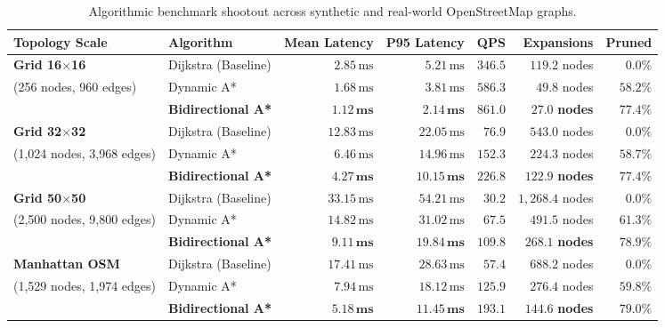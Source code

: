 \documentclass[10pt,a4paper]{article}
\begin{document}
\begin{table}[H]
\centering
\sffamily\scriptsize
\renewcommand{\arraystretch}{1.10}
\begin{tabularx}{\textwidth}{l l r r r r r}
\toprule
\textbf{Topology Scale} & \textbf{Algorithm} & \textbf{Mean Latency} & \textbf{P95 Latency} & \textbf{QPS} & \textbf{Expansions} & \textbf{Pruned} \\
\midrule
\textbf{Grid 16$\times$16} & Dijkstra (Baseline)  & $2.85\,\text{ms}$ & $5.21\,\text{ms}$ & $346.5$ & $119.2$ nodes & $0.0\%$ \\
(256 nodes, 960 edges)     & Dynamic A*           & $1.68\,\text{ms}$ & $3.81\,\text{ms}$ & $586.3$ & $49.8$ nodes  & $58.2\%$ \\
                           & \textbf{Bidirectional A*} & $\mathbf{1.12\,\text{ms}}$ & $\mathbf{2.14\,\text{ms}}$ & $\mathbf{861.0}$ & $\mathbf{27.0}$ \textbf{nodes} & $\mathbf{77.4\%}$ \\
\midrule
\textbf{Grid 32$\times$32} & Dijkstra (Baseline)  & $12.83\,\text{ms}$ & $22.05\,\text{ms}$ & $76.9$ & $543.0$ nodes & $0.0\%$ \\
(1,024 nodes, 3,968 edges) & Dynamic A*           & $6.46\,\text{ms}$ & $14.96\,\text{ms}$ & $152.3$ & $224.3$ nodes & $58.7\%$ \\
                           & \textbf{Bidirectional A*} & $\mathbf{4.27\,\text{ms}}$ & $\mathbf{10.15\,\text{ms}}$ & $\mathbf{226.8}$ & $\mathbf{122.9}$ \textbf{nodes} & $\mathbf{77.4\%}$ \\
\midrule
\textbf{Grid 50$\times$50} & Dijkstra (Baseline)  & $33.15\,\text{ms}$ & $54.21\,\text{ms}$ & $30.2$ & $1,268.4$ nodes & $0.0\%$ \\
(2,500 nodes, 9,800 edges) & Dynamic A*           & $14.82\,\text{ms}$ & $31.02\,\text{ms}$ & $67.5$ & $491.5$ nodes & $61.3\%$ \\
                           & \textbf{Bidirectional A*} & $\mathbf{9.11\,\text{ms}}$ & $\mathbf{19.84\,\text{ms}}$ & $\mathbf{109.8}$ & $\mathbf{268.1}$ \textbf{nodes} & $\mathbf{78.9\%}$ \\
\midrule
\textbf{Manhattan OSM}     & Dijkstra (Baseline)  & $17.41\,\text{ms}$ & $28.63\,\text{ms}$ & $57.4$ & $688.2$ nodes & $0.0\%$ \\
(1,529 nodes, 1,974 edges) & Dynamic A*           & $7.94\,\text{ms}$ & $18.12\,\text{ms}$ & $125.9$ & $276.4$ nodes & $59.8\%$ \\
                           & \textbf{Bidirectional A*} & $\mathbf{5.18\,\text{ms}}$ & $\mathbf{11.45\,\text{ms}}$ & $\mathbf{193.1}$ & $\mathbf{144.6}$ \textbf{nodes} & $\mathbf{79.0\%}$ \\
\bottomrule
\end{tabularx}
\caption{Algorithmic benchmark shootout across synthetic and real-world OpenStreetMap graphs.}
\label{tab:benchmarks}
\end{table}
\end{document}
